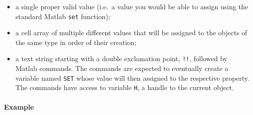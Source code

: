 \begin{itemize}
\item
  a single proper valid value (i.e.~a value you would be able to assign
  using the standard Matlab \texttt{set} function);
\item
  a cell array of multiple different values that will be assigned to the
  objects of the same type in order of their creation;
\item
  a text string starting with a double exclamation point, \texttt{!!},
  followed by Matlab commands. The commands are expected to eventually
  create a variable named \texttt{SET} whose value will then assigned to
  the respective property. The commands have access to variable
  \texttt{H}, a handle to the current object.
\end{itemize}

\paragraph{Example}\label{example}


